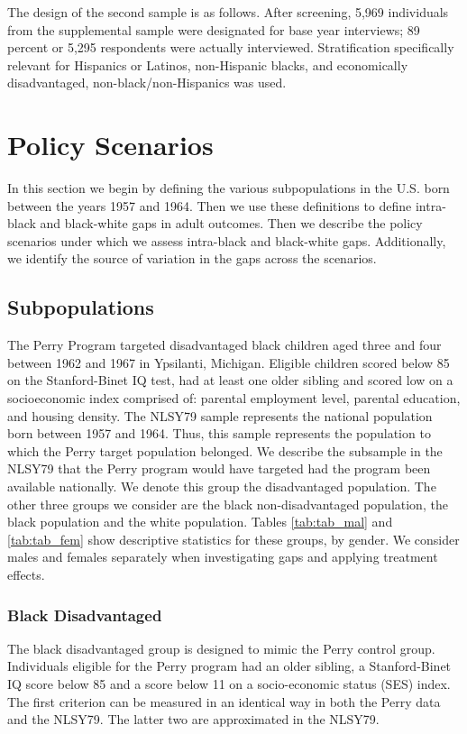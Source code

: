 The design of the second sample is as follows. After screening, 5,969 individuals from the supplemental sample were designated for base year interviews; 89 percent or 5,295 respondents were actually interviewed.  Stratification specifically relevant for Hispanics or Latinos, non-Hispanic blacks, and economically disadvantaged, non-black/non-Hispanics was used. 

\section{Policy Scenarios}
In this section we begin by defining the various subpopulations in the U.S. born between the years 1957 and 1964. Then we use these definitions to define intra-black and black-white gaps in adult outcomes. Then we describe the policy scenarios under which we assess intra-black and black-white gaps. Additionally, we identify the source of variation in the gaps across the scenarios. 

\subsection{Subpopulations}
The Perry Program targeted disadvantaged black children aged three and four between 1962 and 1967 in Ypsilanti, Michigan. Eligible children scored below 85 on the Stanford-Binet IQ test, had at least one older sibling and scored low on a socioeconomic index comprised of: parental employment level, parental education, and housing density. The NLSY79 sample represents the national population born between 1957 and 1964. Thus, this sample represents the population to which the Perry target population belonged. We describe the subsample in the NLSY79 that the Perry program would have targeted had the program been available nationally. We denote this group the disadvantaged population. The other three groups we consider are the black non-disadvantaged population, the black population and the white population. Tables \ref{tab:tab_mal} and \ref{tab:tab_fem} show descriptive statistics for these groups, by gender. We consider males and females separately when investigating gaps and applying treatment effects.

\subsubsection*{Black Disadvantaged}
The black disadvantaged group is designed to mimic the Perry control group. Individuals eligible for the Perry program had an older sibling, a Stanford-Binet IQ score below 85 and a score below 11 on a socio-economic status (SES) index. The first criterion can be measured in an identical way in both the Perry data and the NLSY79. The latter two are approximated in the NLSY79.

